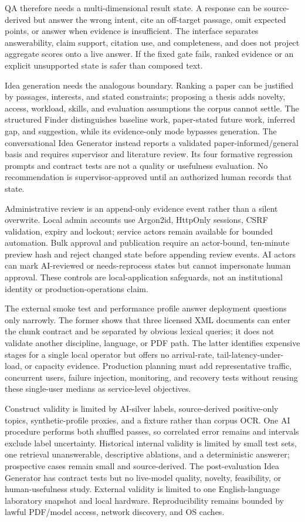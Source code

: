 \documentclass[conference,letterpaper]{IEEEtran}
\begin{document}
QA therefore needs a multi-dimensional result state. A response can be source-derived but answer the wrong intent, cite an off-target passage, omit expected points, or answer when evidence is insufficient. The interface separates answerability, claim support, citation use, and completeness, and does not project aggregate scores onto a live answer. If the fixed gate fails, ranked evidence or an explicit unsupported state is safer than composed text.

Idea generation needs the analogous boundary. Ranking a paper can be justified by passages, interests, and stated constraints; proposing a thesis adds novelty, access, workload, skills, and evaluation assumptions the corpus cannot settle. The structured Finder distinguishes baseline work, paper-stated future work, inferred gap, and suggestion, while its evidence-only mode bypasses generation. The conversational Idea Generator instead reports a validated paper-informed/general basis and requires supervisor and literature review. Its four formative regression prompts and contract tests are not a quality or usefulness evaluation. No recommendation is supervisor-approved until an authorized human records that state.

Administrative review is an append-only evidence event rather than a silent overwrite. Local admin accounts use Argon2id, HttpOnly sessions, CSRF validation, expiry and lockout; service actors remain available for bounded automation. Bulk approval and publication require an actor-bound, ten-minute preview hash and reject changed state before appending review events. AI actors can mark AI-reviewed or needs-reprocess states but cannot impersonate human approval. These controls are local-application safeguards, not an institutional identity or production-operations claim.

The external smoke test and performance profile answer deployment questions only narrowly. The former shows that three licensed XML documents can enter the chunk contract and be separated by obvious lexical queries; it does not validate another discipline, language, or PDF path. The latter identifies expensive stages for a single local operator but offers no arrival-rate, tail-latency-under-load, or capacity evidence. Production planning must add representative traffic, concurrent users, failure injection, monitoring, and recovery tests without reusing these single-user medians as service-level objectives.

Construct validity is limited by AI-silver labels, source-derived positive-only topics, synthetic-profile proxies, and a fixture rather than corpus OCR. One AI procedure performs both shuffled passes, so correlated error remains and intervals exclude label uncertainty. Historical internal validity is limited by small test sets, one retrieval unanswerable, descriptive ablations, and a deterministic answerer; prospective cases remain small and source-derived. The post-evaluation Idea Generator has contract tests but no live-model quality, novelty, feasibility, or human-usefulness study. External validity is limited to one English-language laboratory snapshot and local hardware. Reproducibility remains bounded by lawful PDF/model access, network discovery, and OS caches.
\end{document}
